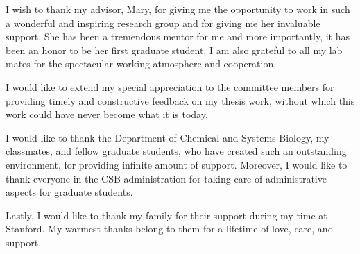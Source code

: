 
I wish to thank my advisor, Mary, for giving me the opportunity to work in such a wonderful and inspiring research group and for giving me her invaluable support. She has been a tremendous mentor for me and more importantly, it has been an honor to be her first graduate student. I am also grateful to all my lab mates for the spectacular working atmosphere and cooperation.

I would like to extend my special appreciation to the committee members for providing timely and constructive feedback on my thesis work, without which this work could have never become what it is today.

I would like to thank the Department of Chemical and Systems Biology, my classmates, and fellow graduate students, who have created such an outstanding environment, for providing infinite amount of support. Moreover, I would like to thank everyone in the CSB administration for taking care of administrative aspects for graduate students.

Lastly, I would like to thank my family for their support during my time at Stanford. My warmest thanks belong to them for a lifetime of love, care, and support.
